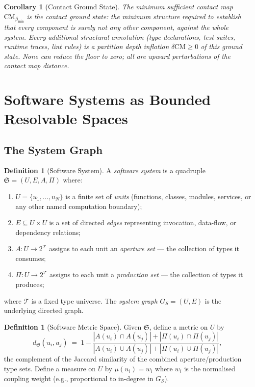 \documentclass[12pt,a4paper,twocolumn]{article}
\theoremstyle{plain}
\newtheorem{corollary}[theorem]{Corollary}
\theoremstyle{definition}
\newtheorem{definition}[theorem]{Definition}
\theoremstyle{remark}
\newcommand{\CM}{\mathrm{CM}}
\newcommand{\bmin}{\beta_{\min}}
\newcommand{\CMbmin}{\CM_{\bmin}}
\newcommand{\GS}{G_S}
\begin{document}
\begin{corollary}[Contact Ground State]
\label{cor:ground-state}
The minimum sufficient contact map $\CMbmin$ is the \emph{contact ground
state}: the minimum structure required to establish that every component is
surely not any other component, against the whole system.  Every additional
structural annotation (type declarations, test suites, runtime traces,
lint rules) is a partition depth inflation $\delta\CM \geq 0$ of this
ground state.  None can reduce the floor to zero; all are upward
perturbations of the contact map distance.
\end{corollary}

\section{Software Systems as Bounded Resolvable Spaces}
\label{sec:software}

\subsection{The System Graph}

\begin{definition}[Software System]
\label{def:software-system}
A \emph{software system} is a quadruple $\mathfrak{S} = (U, E, A, \Pi)$
where:
\begin{enumerate}[label=(\roman*)]
  \item $U = \{u_1, \ldots, u_N\}$ is a finite set of \emph{units} (functions,
    classes, modules, services, or any other named computation boundary);
  \item $E \subseteq U \times U$ is a set of directed \emph{edges}
    representing invocation, data-flow, or dependency relations;
  \item $A : U \to 2^\mathcal{T}$ assigns to each unit an \emph{aperture set}
    --- the collection of types it consumes;
  \item $\Pi : U \to 2^\mathcal{T}$ assigns to each unit a
    \emph{production set} --- the collection of types it produces;
\end{enumerate}
where $\mathcal{T}$ is a fixed type universe.  The \emph{system graph}
$\GS = (U, E)$ is the underlying directed graph.
\end{definition}

\begin{definition}[Software Metric Space]
\label{def:software-metric}
Given $\mathfrak{S}$, define a metric on $U$ by
\begin{equation}
  d_\mathfrak{S}(u_i, u_j) \;=\;
    1 - \frac{|A(u_i) \cap A(u_j)| + |\Pi(u_i) \cap \Pi(u_j)|}
             {|A(u_i) \cup A(u_j)| + |\Pi(u_i) \cup \Pi(u_j)|},
\end{equation}
the complement of the Jaccard similarity of the combined aperture/production
type sets.  Define a measure on $U$ by $\mu(u_i) = w_i$ where $w_i$ is the
normalised coupling weight (e.g., proportional to in-degree in $\GS$).
\end{definition}
\end{document}
